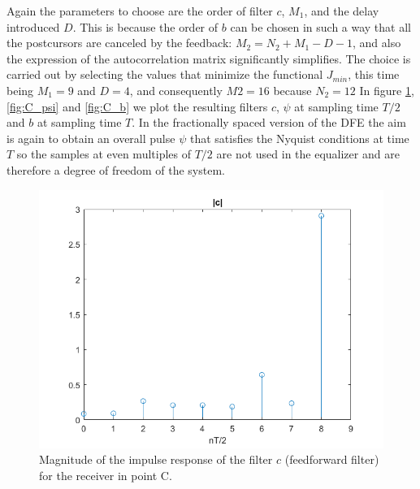 \documentclass[a4paper,11.5pt]{article}
\begin{document}
Again the parameters to choose are the order of filter $c$, $M_1$, and the delay introduced $D$. This is because the order of $b$ can be chosen in such a way that all the postcursors are canceled by the feedback: $M_2=N_2+M_1-D-1$, and also the expression of the autocorrelation matrix significantly simplifies. The choice is carried out by selecting the values that minimize the functional $J_{min}$, this time being $M_1=9$ and $D=4$, and consequently $M2=16$ because $N_2=12$  In figure \ref{fig:C_c}, \ref{fig:C_psi} and \ref{fig:C_b} we plot the resulting filters $c$, $\psi$ at sampling time $T/2$ and $b$ at sampling time $T$. In the fractionally spaced version of the DFE the aim is again to obtain an overall pulse $\psi$ that satisfies the Nyquist conditions at time $T$ so the samples at even multiples of $T/2$ are not used in the equalizer and are therefore a degree of freedom of the system.

\begin{figure}[ht]
	\begin{center}   
		\includegraphics[width=\textwidth]{figs/C_c.png} 
		\caption{Magnitude of the impulse response of the filter $c$ (feedforward filter) for the receiver in point C.}
		\label{fig:C_c}
	\end{center}
\end{figure}
\end{document}
